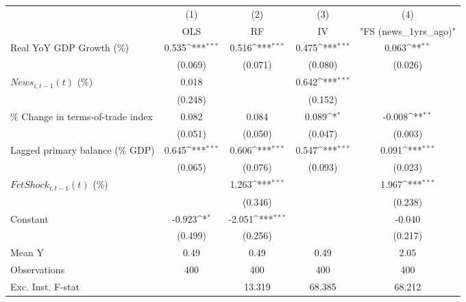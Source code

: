 {
\def\sym#1{\ifmmode^{#1}\else\(^{#1}\)\fi}
\begin{tabular}{l*{4}{c}}
\toprule
                    &\multicolumn{1}{c}{(1)}&\multicolumn{1}{c}{(2)}&\multicolumn{1}{c}{(3)}&\multicolumn{1}{c}{(4)}\\
                    &\multicolumn{1}{c}{OLS}&\multicolumn{1}{c}{RF}&\multicolumn{1}{c}{IV}&\multicolumn{1}{c}{ "FS (news_1yrs_ago)" }\\
\midrule
Real YoY GDP Growth (\%)&       0.535\sym{***}&       0.516\sym{***}&       0.475\sym{***}&       0.063\sym{**} \\
                    &     (0.069)         &     (0.071)         &     (0.080)         &     (0.026)         \\
\addlinespace
$ News_{i,t-1}(t)$ (\%)&       0.018         &                     &       0.642\sym{***}&                     \\
                    &     (0.248)         &                     &     (0.152)         &                     \\
\addlinespace
\% Change in terms-of-trade index&       0.082         &       0.084         &       0.089\sym{*}  &      -0.008\sym{**} \\
                    &     (0.051)         &     (0.050)         &     (0.047)         &     (0.003)         \\
\addlinespace
Lagged primary balance (\% GDP)&       0.645\sym{***}&       0.606\sym{***}&       0.547\sym{***}&       0.091\sym{***}\\
                    &     (0.065)         &     (0.076)         &     (0.093)         &     (0.023)         \\
\addlinespace
$ FctShock_{i,t-1}(t)$ (\%)&                     &       1.263\sym{***}&                     &       1.967\sym{***}\\
                    &                     &     (0.346)         &                     &     (0.238)         \\
\addlinespace
Constant            &      -0.923\sym{*}  &      -2.051\sym{***}&                     &      -0.040         \\
                    &     (0.499)         &     (0.256)         &                     &     (0.217)         \\
\midrule
Mean Y              &        0.49         &        0.49         &        0.49         &        2.05         \\
Observations        &         400         &         400         &         400         &         400         \\
Exc. Inst. F-stat   &                     &      13.319         &      68.385         &      68.212         \\
\bottomrule
\end{tabular}
}
